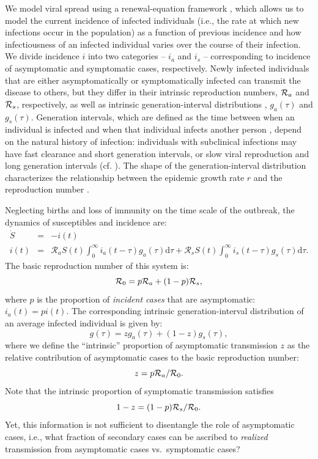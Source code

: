 We model viral spread using a renewal-equation framework \citep{heesterbeek1996concept}, which allows us to model the current incidence of infected individuals (i.e., the rate at which new infections occur in the population) as a function of previous incidence and how infectiousness of an infected individual varies over the course of their infection.
We divide incidence $i$ into two categories -- $i_a$ and $i_s$ -- corresponding to incidence of asymptomatic and symptomatic cases, respectively.
Newly infected individuals that are either asymptomatically or symptomatically infected can transmit the disease to others, but they differ in their intrinsic reproduction numbers, ${\cal{R}}_a$ and ${\cal{R}}_s$, respectively, as well as intrinsic generation-interval distributions \citep{champredon2015intrinsic}, $g_a(\tau)$ and $g_s(\tau)$.
Generation intervals, which are defined as the time between when an individual is infected and when that individual infects another person \citep{svensson2007note}, depend on the natural history of infection:
individuals with subclinical infections may have fast clearance and short generation intervals, or slow viral reproduction and long generation intervals (cf. \citep{roberts2007model}).
The shape of the generation-interval distribution characterizes the relationship between the epidemic growth rate $r$ and the reproduction number \citep{wallinga2007generation}.

Neglecting births and loss of immunity on the time scale of the outbreak, the dynamics of susceptibles and incidence are:
\begin{eqnarray}
\dot{S}&=&-i(t) \\
i(t)&=&\mathcal R_a S(t) \int_0^\infty i_a(t-\tau) g_a(\tau) \mathrm{d}\tau + \mathcal R_s S(t) \int_0^\infty i_s(t-\tau) g_s(\tau) \mathrm{d}\tau.
\end{eqnarray}
The basic reproduction number of this system is:
\begin{equation}
{\cal{R}}_{0}= p {\cal{R}}_a + (1-p) {\cal{R}}_s,
\end{equation}
where $p$ is the proportion of \emph{incident cases} that are asymptomatic: $i_a(t) = p i(t)$.
The corresponding intrinsic generation-interval distribution of an average infected individual is given by: 
\begin{equation}
g(\tau) = z g_a(\tau) + (1-z) g_s(\tau),
\end{equation}
where we define the ``intrinsic'' proportion of asymptomatic transmission $z$ as the relative contribution of asymptomatic cases to the basic reproduction number:
\begin{equation}
z = p {\cal{R}}_a/{\cal{R}}_{0}.
\end{equation}
Note that the intrinsic proportion of symptomatic transmission satisfies
\begin{equation}
1-z = (1-p) {\cal{R}}_s/{\cal{R}}_{0}.
\end{equation}
Yet, this information is not sufficient to disentangle the role of asymptomatic cases, i.e., what fraction of secondary cases can be ascribed to \emph{realized} transmission from asymptomatic cases vs.~symptomatic cases?

